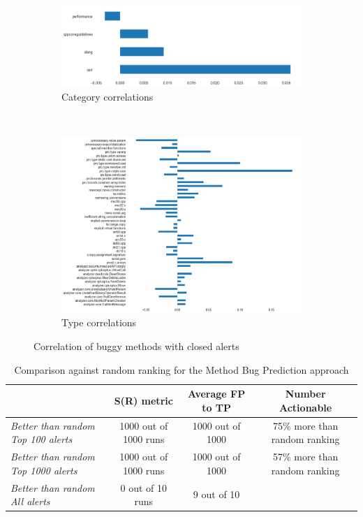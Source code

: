 \begin{figure}[H]
	\begin{subfigure}{\textwidth}
		\centering
		\includegraphics[scale=0.3]{./src/methodBug/methodbug_category_correlations.png}
		\caption{Category correlations}\label{}
	\end{subfigure}\\
	\begin{subfigure}{\textwidth}
	\centering
	\includegraphics[scale=0.3]{./src/methodBug/methodbug_type_correlations.png}
	\caption{Type correlations}\label{}
	\end{subfigure}
	\caption{Correlation of buggy methods with closed alerts}
	\label{results:buggy_correlationss}
\end{figure}


\begin{table}[H]
	\caption{Comparison against random ranking for the Method Bug Prediction approach}
	\label{results:ranking_methodbug_alerts}
	\centering
	\begin{tabular}{@{}lccc@{}}
		\toprule
		& \textbf{S(R) metric}  & \textbf{Average FP to TP} & \textbf{Number Actionable}    \\ \midrule
		\textit{Better than random Top 100 alerts}  & 1000 out of 1000 runs & 1000 out of 1000          & 75\% more than random ranking \\
		\textit{Better than random Top 1000 alerts} & 1000 out of 1000 runs & 1000 out of 1000          & 57\% more than random ranking \\
		\textit{Better than random All alerts}      & 0 out of 10 runs      & 9 out of 10               & \multicolumn{1}{l}{}          \\ \bottomrule
	\end{tabular}
\end{table}

